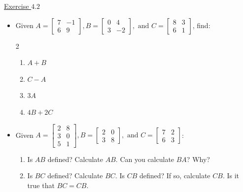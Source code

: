 \underline{Exercise $4.2$}
\begin{itemize}

\item[1.] Given $A=\left[\begin{array}{cc}7 & -1 \\ 6 & 9\end{array}\right],  B=\left[\begin{array}{cc}0 & 4 \\ 3 & -2\end{array}\right], \text{ and }C=\left[\begin{array}{ll}8 & 3 \\ 6 & 1\end{array}\right]$, find: 
\begin{multicols}{2}
\begin{enumerate}\renewcommand{\labelenumi}{\alph{enumi})}
\item [(a)] $A+B$
\item [(b)] $C-A$
\item [(c)] $3A$
\item [(d)] $4B+2C$ 
\end{enumerate}
\end{multicols}

\item[2.] Given $A = \left[\begin{array}{cc}
2 & 8 \\
3 & 0 \\
5 & 1
\end{array}\right], B=\left[\begin{array}{cc} 2 & 0 \\ 3 & 8\end{array}\right], \text{ and }
C=\left[\begin{array}{cc} 7 & 2 \\ 6 & 3\end{array}\right]$:
\begin{enumerate}
	\item[(a)] Is $AB$ defined? Calculate $AB$. Can you calculate $BA$? Why?
	\item[(b)] Is $BC$ defined? Calculate $BC$. Is $CB$ defined? If so, calculate $CB$. Is it true that $BC=CB$. 
\end{enumerate}


\end{itemize}
